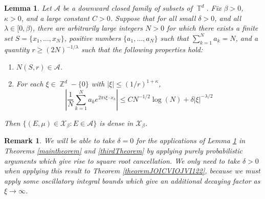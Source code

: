 \documentclass[dvipsnames,letterpaper,12pt]{article}
\numberwithin{equation}{section}
\DeclareMathOperator{\ZZ}{\mathbb{Z}}
\DeclareMathOperator{\TT}{\mathbb{T}}
\newtheorem{lemma}[theorem]{Lemma}
\newtheorem{remark}[theorem]{Remark}
\numberwithin{theorem}{section}
\begin{document}
\begin{lemma} \label{LemmaFIOAJFOIWJ}
    Let $\mathcal{A}$ be a downward closed family of subsets of $\TT^d$. Fix $\beta > 0$, $\kappa > 0$, and a large constant $C > 0$. Suppose that for all small $\delta > 0$, and all $\lambda \in [0,\beta)$, there are arbitrarily large integers $N > 0$ for which there exists a finite set $S = \{ x_1, \dots, x_N \}$, positive numbers $\{ a_1, \dots, a_N \}$ such that $\sum_{k = 1}^N a_k = N$, and a quantity $r \geq (2N)^{-1/\lambda}$ such that the following properties hold:
    \begin{enumerate}
        \item[(1)] $N(S,r) \in \mathcal{A}$.
        \item[(2)] For each $\xi \in \ZZ^d - \{ 0 \}$ with $|\xi| \leq (1/r)^{1 + \kappa}$,
        \[ \left| \frac{1}{N} \sum_{k = 1}^N a_k e^{2 \pi i \xi \cdot x_k} \right| \leq C N^{-1/2} \log(N) + \delta |\xi|^{-\lambda/2} \]
    \end{enumerate}
    Then $\{ (E,\mu) \in \mathcal{X}_\beta : E \in \mathcal{A} \}$ is dense in $\mathcal{X}_\beta$.
\end{lemma}

\begin{remark}
    We will be able to take $\delta = 0$ for the applications of Lemma \ref{LemmaFIOAJFOIWJ} in Theorems \ref{maintheorem} and \ref{thirdTheorem} by applying purely probabilistic arguments which give rise to square root cancellation. We only need to take $\delta > 0$ when applying this result to Theorem \ref{theoremJOICVIOJVI122}, because we must apply some oscillatory integral bounds which give an additional decaying factor as $\xi \to \infty$.
\end{remark}
\end{document}
